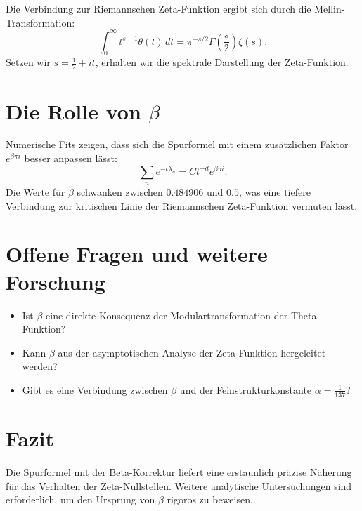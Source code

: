 \documentclass[a4paper,12pt]{article}
\begin{document}
Die Verbindung zur Riemannschen Zeta-Funktion ergibt sich durch die Mellin-Transformation:
\begin{equation}
    \int_0^\infty t^{s-1} \theta(t) \, dt = \pi^{-s/2} \Gamma\left(\frac{s}{2}\right) \zeta(s).
\end{equation}
Setzen wir \( s = \frac{1}{2} + it \), erhalten wir die spektrale Darstellung der Zeta-Funktion.

\section{Die Rolle von \( \beta \)}
Numerische Fits zeigen, dass sich die Spurformel mit einem zusätzlichen Faktor \( e^{\beta \pi i} \) besser anpassen lässt:
\begin{equation}
    \sum_n e^{-t \lambda_n} = C t^{-d} e^{\beta \pi i}.
\end{equation}
Die Werte für \( \beta \) schwanken zwischen \( 0.484906 \) und \( 0.5 \), was eine tiefere Verbindung zur kritischen Linie der Riemannschen Zeta-Funktion vermuten lässt.

\section{Offene Fragen und weitere Forschung}
\begin{itemize}
    \item Ist \( \beta \) eine direkte Konsequenz der Modulartransformation der Theta-Funktion?
    \item Kann \( \beta \) aus der asymptotischen Analyse der Zeta-Funktion hergeleitet werden?
    \item Gibt es eine Verbindung zwischen \( \beta \) und der Feinstrukturkonstante \( \alpha = \frac{1}{137} \)?
\end{itemize}

\section{Fazit}
Die Spurformel mit der Beta-Korrektur liefert eine erstaunlich präzise Näherung für das Verhalten der Zeta-Nullstellen. Weitere analytische Untersuchungen sind erforderlich, um den Ursprung von \( \beta \) rigoros zu beweisen.
\end{document}
